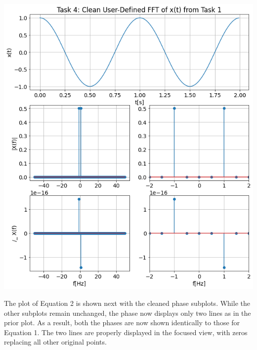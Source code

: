 \documentclass[12pt]{report}
\begin{document}
\begin{center}
	\includegraphics[scale = 0.35]{Lab 9 - Plots/Task4-1.png}\\[1.0 cm]
\end{center}

The plot of Equation 2 is shown next with the cleaned phase subplots. While the other subplots remain unchanged, the phase now displays only two lines as in the prior plot. As a result, both the phases are now shown identically to those for Equation 1. The two lines are properly displayed in the focused view, with zeros replacing all other original points. \\
\end{document}
